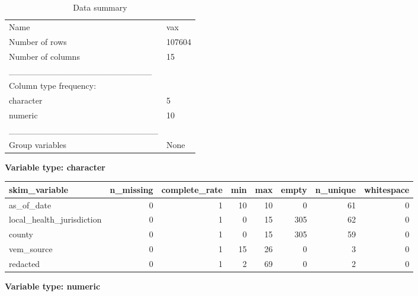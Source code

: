 \documentclass[
]{article}
\begin{document}
\begin{longtable}[]{@{}ll@{}}
\caption{Data summary}\tabularnewline
\toprule
\endhead
Name & vax \\
Number of rows & 107604 \\
Number of columns & 15 \\
\_\_\_\_\_\_\_\_\_\_\_\_\_\_\_\_\_\_\_\_\_\_\_ & \\
Column type frequency: & \\
character & 5 \\
numeric & 10 \\
\_\_\_\_\_\_\_\_\_\_\_\_\_\_\_\_\_\_\_\_\_\_\_\_ & \\
Group variables & None \\
\bottomrule
\end{longtable}

\textbf{Variable type: character}

\begin{longtable}[]{@{}lrrrrrrr@{}}
\toprule
skim\_variable & n\_missing & complete\_rate & min & max & empty &
n\_unique & whitespace \\
\midrule
\endhead
as\_of\_date & 0 & 1 & 10 & 10 & 0 & 61 & 0 \\
local\_health\_jurisdiction & 0 & 1 & 0 & 15 & 305 & 62 & 0 \\
county & 0 & 1 & 0 & 15 & 305 & 59 & 0 \\
vem\_source & 0 & 1 & 15 & 26 & 0 & 3 & 0 \\
redacted & 0 & 1 & 2 & 69 & 0 & 2 & 0 \\
\bottomrule
\end{longtable}

\textbf{Variable type: numeric}
\end{document}
